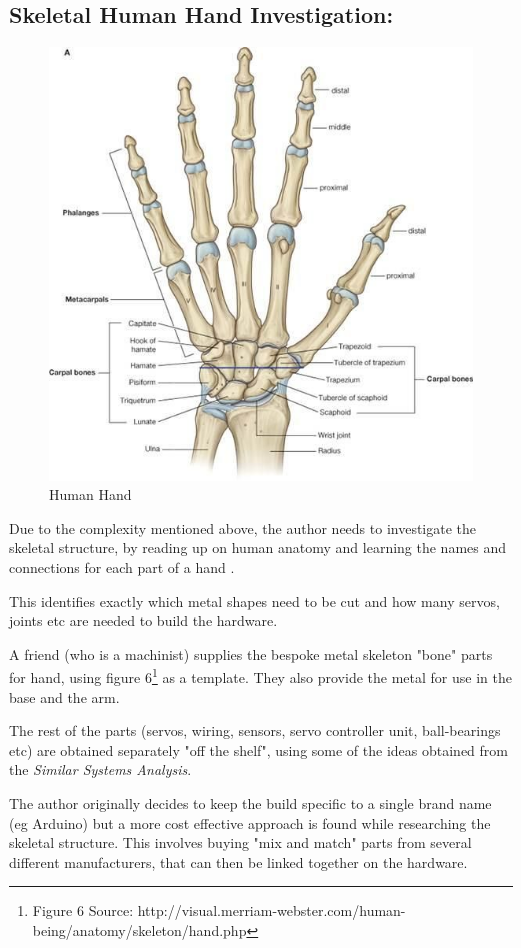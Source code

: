 \documentclass[progress]{cmpreport}
\begin{document}
{{{{{{\subsection{Skeletal Human Hand Investigation:}
\begin{figure}
	\caption{Human Hand} 
	\includegraphics[width=0.7\linewidth]{photos/hand.jpg}  
\end{figure}

Due to the complexity mentioned above, the author needs to investigate the skeletal structure, by reading up on human anatomy and learning the names and connections for each part of a hand \citep{freivalds2011biomechanics}.

This identifies exactly which metal shapes need to be cut and how many servos, joints etc are needed to build the hardware. \newline

A friend (who is a machinist) supplies the bespoke metal skeleton "bone" parts for hand, using figure 6\footnote {Figure 6 Source: http://visual.merriam-webster.com/human-being/anatomy/skeleton/hand.php} as a template. They also provide the metal for use in the base and the arm.
 
The rest of the parts (servos, wiring, sensors, servo controller unit, ball-bearings etc) are obtained separately "off the shelf", using some of the ideas obtained from the \textit{Similar Systems Analysis}. 

The author originally decides to keep the build specific to a single brand name (eg Arduino) but a more cost effective approach is found while researching the skeletal structure. This involves buying "mix and match" parts from several different manufacturers, that can then be linked together on the hardware. 

}}}}}}
\end{document}
